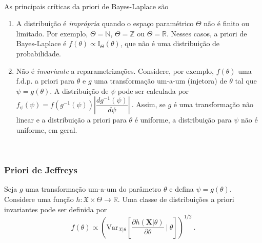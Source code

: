 \documentclass[
]{book}
\begin{document}
\(~\)

As principais críticas da priori de Bayes-Laplace são

\begin{enumerate}
\def\labelenumi{\arabic{enumi}.}
\item
  A distribuição é \emph{imprópria} quando o espaço paramétrico \(\Theta\) não é finito ou limitado. Por exemplo, \(\Theta=\mathbb{N}\), \(\Theta=\mathbb{Z}\) ou \(\Theta=\mathbb{R}\). Nesses casos, a priori de Bayes-Laplace é \(f(\theta)\propto \mathbb{I}_\Theta(\theta)\), que não é uma distribuição de probabilidade.
\item
  Não é \emph{invariante} a reparametrizações. Considere, por exemplo, \(f(\theta)\) uma f.d.p. a priori para \(\theta\) e \(g\) uma transformação um-a-um (injetora) de \(\theta\) tal que \(\psi=g(\theta)\). A distribuição de \(\psi\) pode ser calculada por \(f_\psi(\psi) = f\left(g^{-1}(\psi)\right)\left|\dfrac{dg^{-1}(\psi)}{d\psi}\right|~.\) Assim, se \(g\) é uma transformação não linear e a distribuição a priori para \(\theta\) é uniforme, a distribuição para \(\psi\) não é uniforme, em geral.
\end{enumerate}

\(~\)

\hypertarget{priori-de-jeffreys}{%
\subsubsection{Priori de Jeffreys}\label{priori-de-jeffreys}}

Seja \(g\) uma transformação um-a-um do parâmetro \(\theta\) e defina \(\psi=g(\theta)\). Considere uma função \(h:\mathfrak{X}\times\Theta\longrightarrow\mathbb{R}\). Uma classe de distribuições a priori invariantes pode ser definida por
\[f(\theta) \propto \left(\text{Var}_{X|\theta}\left[\dfrac{\partial h(\boldsymbol X | \theta)}{\partial\theta}~\bigg|~\theta\right]\right)^{1/2}~.\]
\end{document}
